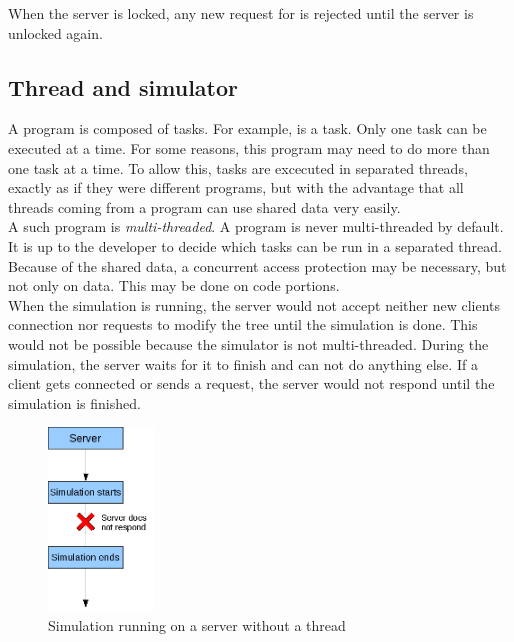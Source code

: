When the server is locked, any new request for \cf is rejected until the server
is unlocked again.


\subsection{Thread and simulator}

A program is composed of tasks. For example,  is
a task. Only one task can be executed at a time. For some reasons, this program
may need to do more than one task at a time. To allow this, tasks are excecuted
in separated threads, exactly as if they were different programs, but with the
advantage that all threads coming from a program can use shared data very
easily. \\

A such program is \textit{multi-threaded}. A program is never multi-threaded by
default. It is up to the developer to decide which tasks can be run in a
separated thread. Because of the shared data, a concurrent access protection
may be necessary, but not only on data. This may be done on code portions.\\

When the simulation is running, the server would not accept neither new clients
connection nor requests to modify the tree until the simulation is done. This
would not be possible because the simulator is not multi-threaded. During the
simulation, the server waits for it to finish and can not do anything else. If
a client gets connected or sends a request, the server would not respond until
the simulation is finished.\\

\begin{figure}[H]
 \begin{center}
  \includegraphics[width=0.25\textwidth]{images/serverWithoutThread}
 \end{center}
\caption{Simulation running on a server without a thread}
\end{figure}

